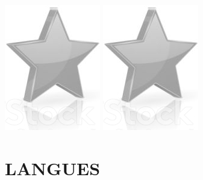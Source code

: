 \documentclass[10pt,a4paper,sans]{article}
\begin{document}
\begin{minipage}[t]{0.26\textwidth}
\begin{mdframed}[style=cadreCompetences]
\begin{itemize}
{                    \includegraphics[scale=0.20]{img/empty_star.png} \hspace{-0.2cm}
                    \includegraphics[scale=0.20]{img/empty_star.png}}
            \end{itemize}

        \section{LANGUES}

\end{mdframed}
\end{minipage}
\end{document}

